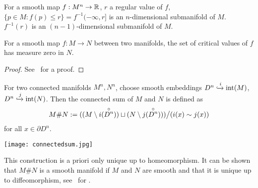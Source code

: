 \documentclass[a4paper,11pt]{article}
\begin{document}
\begin{remark}
    For a smooth map \(f:M^n\to \mathbb{R}\), \(r\) a regular value of \(f\), \(\{p\in M:f(p)\leq r\}=f^{-1}(-\infty,r]\) is an \(n\)-dimensional submanifold of \(M\).\ \(f^{-1}(r)\) is an \((n-1)\)-dimensional submanifold of \(M\).\ 
\end{remark}


\begin{theorem}\label{sard}
    For a smooth map \(f:M\to N\) between two manifolds, the set of critical values of \(f\) has measure zero in \(N\).
\end{theorem}

\begin{proof}
    See\ \cite{lee} for a proof.
\end{proof}

\begin{definition}
    For two connected manifolds \(M^n,N^n\), choose smooth embeddings \(D^n\xhookrightarrow{i}\mathrm{int}(M)\), \(D^n\xhookrightarrow{j}\mathrm{int}(N)\). Then the connected sum of \(M\) and \(N\) is defined as 
    \[M\#N:=((M\setminus i(\overset{\circ}{D^n}))\sqcup(N\setminus j(\overset{\circ}{D^n})))\big/(i(x)\sim j(x))\]
    for all \(x\in\partial D^n\).
    \begin{center}
        \texttt{[image: connectedsum.jpg]}
    \end{center}
\end{definition}

\begin{remark}
    This construction is a priori only unique up to homeomorphism. It can be shown that \(M\#N\) is a smooth manifold if \(M\) and \(N\) are smooth and that it is unique up to diffeomorphism, see\ \cite[VI, Theorem 1.1.]{kosinski} for .
\end{remark}


\end{document}
